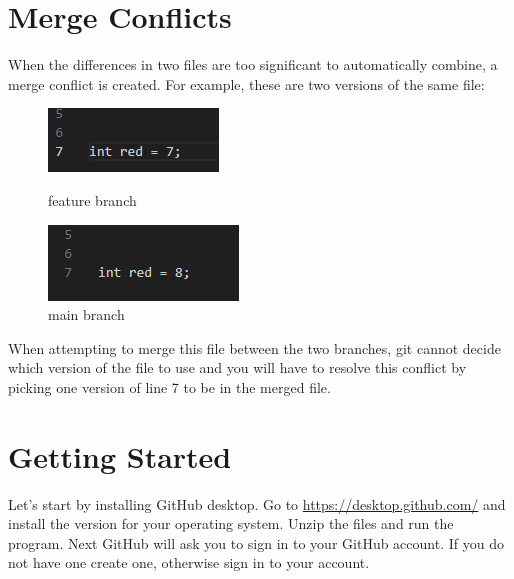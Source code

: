 \documentclass[10pt,twocolumn]{article}
\begin{document}
\section{Merge Conflicts}

    When the differences in two files are too significant to automatically combine, a merge conflict is created. For example, these are two versions of the same file:
\begin{figure}
    \centering
    \includegraphics[width=0.5\linewidth]{image.png}
    \caption{feature branch}
    \includegraphics[width=0.5\linewidth]{File2.png}
    \caption{main branch}
\end{figure}
When attempting to merge this file between the two branches, git cannot decide which version of the file to use and you will have to resolve this conflict by picking one version of line 7 to be in the merged file. 

\section{Getting Started}

Let's start by installing GitHub desktop.  Go to \href{https://desktop.github.com/}{https://desktop.github.com/} and install the version for your operating system.  Unzip the files and run the program. Next GitHub will ask you to sign in to your GitHub account. If you do not have one create one, otherwise sign in to your account.
\end{document}
